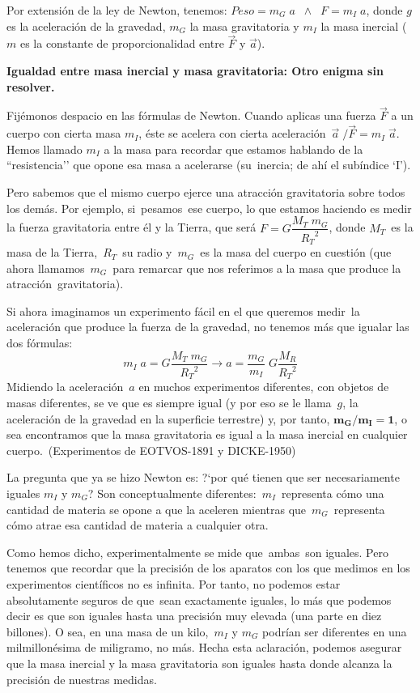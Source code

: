 Por extensión de la ley de Newton, tenemos: $Peso=m_G\; a \;\; \wedge\;\; F=m_I\; a$, donde $g$ es la aceleración de la gravedad, $m_G$ la masa gravitatoria y $m_I$ la masa inercial ($m$ es la constante de proporcionalidad entre $\vec F$ y $\vec a$).

\textbf{Igualdad entre masa inercial y masa gravitatoria: Otro enigma sin resolver.}

Fijémonos despacio en las fórmulas de Newton. Cuando aplicas una fuerza $\vec F$ a un cuerpo con cierta masa $m_I$, éste se acelera con cierta aceleración $\vec a\; / \vec F=m_I\; \vec a$. Hemos llamado $m_I$ a la masa para recordar que estamos hablando de la ``resistencia’’ que opone esa masa a acelerarse (su inercia; de ahí el subíndice `I’).

Pero sabemos que el mismo cuerpo ejerce una atracción gravitatoria sobre todos los demás. Por ejemplo, si pesamos ese cuerpo, lo que estamos haciendo es medir la fuerza gravitatoria entre él y la Tierra, que será $F=G \dfrac{M_T\; m_G}{{R_T}^2}$, donde $M_T$ es la masa de la Tierra, $R_T$ su radio y $m_G$ es la masa del cuerpo en cuestión (que ahora llamamos $m_G$ para remarcar que nos referimos a la masa que produce la atracción gravitatoria). 

Si ahora imaginamos un experimento fácil en el que queremos medir la aceleración que produce la fuerza de la gravedad, no tenemos más que igualar las dos fórmulas:
$$m_I\;a= G \dfrac{M_T\; m_G}{{R_T}^2} \to a= \dfrac{m_G}{m_I}\;G\dfrac{M_R}{{R_T}^2}$$
Midiendo la aceleración $a$ en muchos experimentos diferentes, con objetos de masas diferentes, se ve que es siempre igual (y por eso se le llama $g$, la aceleración de la gravedad en la superficie terrestre) y, por tanto,  $\boldsymbol {m_G/m_I=1}$, o sea encontramos que la masa gravitatoria es igual a la masa inercial en cualquier cuerpo. (Experimentos de EOTVOS-1891 y DICKE-1950)

La pregunta que ya se hizo Newton es: ?`por qué tienen que ser necesariamente iguales $m_I$ y $m_G$? Son conceptualmente diferentes: $m_I$ representa cómo una cantidad de materia se opone a que la aceleren mientras que $m_G$ representa cómo atrae esa cantidad de materia a cualquier otra.

Como hemos dicho, experimentalmente se mide que ambas son iguales. Pero tenemos que recordar que la precisión de los aparatos con los que medimos en los experimentos científicos no es infinita. Por tanto, no podemos estar absolutamente seguros de que sean exactamente iguales, lo más que podemos decir es que son iguales hasta una precisión muy elevada (una parte en diez billones). O sea, en una masa de un kilo, $m_I$ y $m_G$ podrían ser diferentes en una milmillonésima de miligramo, no más. Hecha esta aclaración, podemos asegurar que la masa inercial y la masa gravitatoria son iguales hasta donde alcanza la precisión de nuestras medidas.

